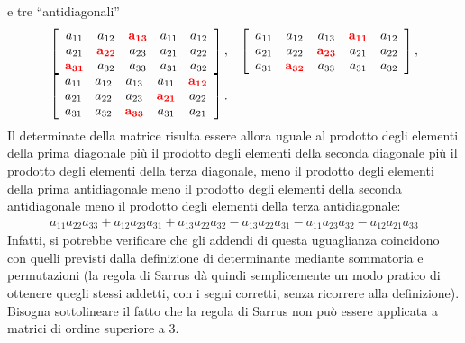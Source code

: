 e tre ``antidiagonali''
\begin{equation}
  \label{eq:dueintdet8}
  \begin{matrix}
    \left[
    \begin{array}{ccccc}
      a_{11} & a_{12} & \mathbf{\color{red} a_{13}} & a_{11} & a_{12}\\
      a_{21} & \mathbf{\color{red}a_{22}} & a_{23} & a_{21} & a_{22}\\
      \mathbf{\color{red}a_{31}} & a_{32} & a_{33} & a_{31} & a_{32} 
    \end{array}\right], & \left[
                          \begin{array}{ccccc}
                            a_{11} & a_{12} & a_{13}
                            & \mathbf{\color{red}a_{11}} & a_{12}\\
                            a_{21} & a_{22}
                            & \mathbf{\color{red}a_{23}} & a_{21} & a_{22}\\
                            a_{31} & \mathbf{\color{red}a_{32}} & a_{33} &  a_{31} & a_{32} 
                          \end{array}\right],\\ \left[
    \begin{array}{ccccc}
      a_{11} & a_{12} & a_{13} & a_{11} & \mathbf{\color{red} a_{12}}\\
      a_{21} & a_{22} & a_{23} & \mathbf{\color{red}a_{21}} & a_{22}\\
      a_{31} & a_{32} & \mathbf{\color{red}a_{33}} & a_{31} & a_{21} 
    \end{array}\right].
  \end{matrix}
\end{equation}
Il determinate della matrice risulta essere allora uguale al prodotto
degli elementi della prima diagonale più il prodotto degli elementi della
seconda diagonale più il prodotto degli elementi della terza diagonale,
meno il prodotto degli elementi della prima antidiagonale meno il prodotto
degli elementi della seconda antidiagonale meno il prodotto degli
elementi della terza antidiagonale:
\begin{eqnarray*}
  a_{11}a_{22}a_{33}+a_{12}a_{23}a_{31}+a_{13}a_{22}a_{32}-a_{13}a_{22}a_{31}
  -a_{11}a_{23}a_{32}-a_{12}a_{21}a_{33}
\end{eqnarray*}
Infatti, si potrebbe verificare che gli addendi di questa uguaglianza
coincidono con quelli previsti dalla definizione di determinante
mediante sommatoria e permutazioni (la regola di Sarrus dà quindi
semplicemente un modo pratico di ottenere quegli stessi addetti, con i
segni corretti, senza ricorrere alla definizione).\\
Bisogna sottolineare il fatto che la regola di Sarrus non può essere
applicata a matrici di ordine superiore a 3.
